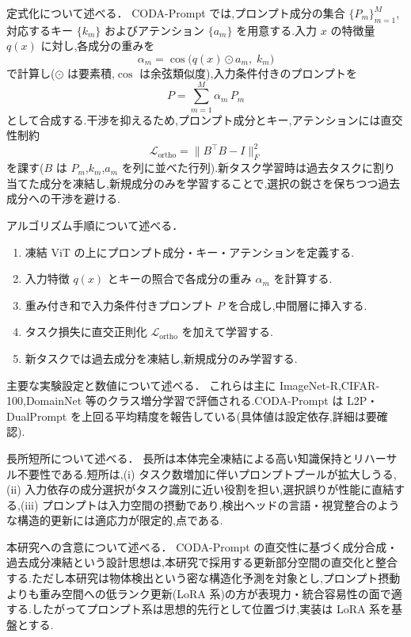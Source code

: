 定式化について述べる．
CODA-Prompt \cite{codaprompt} では,プロンプト成分の集合 $\{P_m\}_{m=1}^{M}$,対応するキー $\{k_m\}$ およびアテンション $\{a_m\}$ を用意する.入力 $x$ の特徴量 $q(x)$ に対し,各成分の重みを
\begin{equation}
\alpha_m = \cos\!\big(q(x) \odot a_m,\; k_m\big)
\end{equation}
で計算し($\odot$ は要素積,$\cos$ は余弦類似度),入力条件付きのプロンプトを
\begin{equation}
P = \sum_{m=1}^{M} \alpha_m \, P_m
\end{equation}
として合成する.干渉を抑えるため,プロンプト成分とキー,アテンションには直交性制約
\begin{equation}
\mathcal{L}_{\text{ortho}} = \| B^\top B - I \|_F^2
\end{equation}
を課す($B$ は $P_m$,$k_m$,$a_m$ を列に並べた行列).新タスク学習時は過去タスクに割り当てた成分を凍結し,新規成分のみを学習することで,選択の鋭さを保ちつつ過去成分への干渉を避ける.

アルゴリズム手順について述べる．
\begin{enumerate}
\item 凍結 ViT の上にプロンプト成分・キー・アテンションを定義する.
\item 入力特徴 $q(x)$ とキーの照合で各成分の重み $\alpha_m$ を計算する.
\item 重み付き和で入力条件付きプロンプト $P$ を合成し,中間層に挿入する.
\item タスク損失に直交正則化 $\mathcal{L}_{\text{ortho}}$ を加えて学習する.
\item 新タスクでは過去成分を凍結し,新規成分のみ学習する.
\end{enumerate}

主要な実験設定と数値について述べる．
これらは主に ImageNet-R,CIFAR-100,DomainNet 等のクラス増分学習で評価される.CODA-Prompt \cite{codaprompt} は L2P・DualPrompt を上回る平均精度を報告している(具体値は設定依存,詳細は要確認).

長所短所について述べる．
長所は本体完全凍結による高い知識保持とリハーサル不要性である.短所は,(i) タスク数増加に伴いプロンプトプールが拡大しうる,(ii) 入力依存の成分選択がタスク識別に近い役割を担い,選択誤りが性能に直結する,(iii) プロンプトは入力空間の摂動であり,検出ヘッドの言語・視覚整合のような構造的更新には適応力が限定的,点である.

本研究への含意について述べる．
CODA-Prompt の直交性に基づく成分合成・過去成分凍結という設計思想は,本研究で採用する更新部分空間の直交化と整合する.ただし本研究は物体検出という密な構造化予測を対象とし,プロンプト摂動よりも重み空間への低ランク更新(LoRA 系)の方が表現力・統合容易性の面で適する.したがってプロンプト系は思想的先行として位置づけ,実装は LoRA 系を基盤とする.

